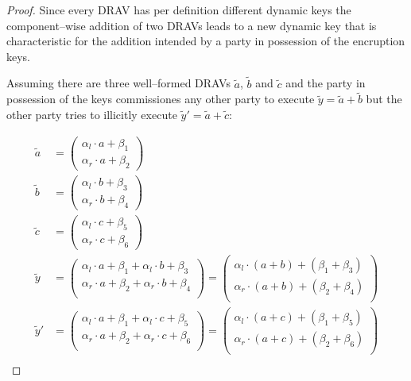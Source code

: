 \begin{proof}

  Since every DRAV has per definition different dynamic keys the
  component--wise addition of two DRAVs leads to a new dynamic key that is
  characteristic for the addition intended by a party in possession of the
  encruption keys.

  Assuming there are three well--formed DRAVs $\widetilde{a}$, $\widetilde{b}$
  and $\widetilde{c}$ and the party in possession of the keys commissiones any
  other party to execute $\widetilde{y} = \widetilde{a} + \widetilde{b}$ but the
  other party tries to illicitly execute $\widetilde{y}' = \widetilde{a} +
  \widetilde{c}$:

  \begin{align*}
    \widetilde{a} &=
    \begin{pmatrix}
      \alpha_l \cdot a + \beta_1\\
      \alpha_r \cdot a + \beta_2
    \end{pmatrix}\\
    \widetilde{b} &=
    \begin{pmatrix}
      \alpha_l \cdot b + \beta_3\\
      \alpha_r \cdot b + \beta_4
    \end{pmatrix}\\
    \widetilde{c} &=
    \begin{pmatrix}
      \alpha_l \cdot c + \beta_5\\
      \alpha_r \cdot c + \beta_6
    \end{pmatrix}\\
    \widetilde{y} &=
    \begin{pmatrix}
      \alpha_l \cdot a + \beta_1 + \alpha_l \cdot b + \beta_3\\
      \alpha_r \cdot a + \beta_2 + \alpha_r \cdot b + \beta_4\\
    \end{pmatrix} =
    \begin{pmatrix}
      \alpha_l \cdot (a+b) + (\beta_1 + \beta_3)\\
      \alpha_r \cdot (a+b) + (\beta_2 + \beta_4)\\
    \end{pmatrix}\\
    \widetilde{y}' &=
    \begin{pmatrix}
      \alpha_l \cdot a + \beta_1 + \alpha_l \cdot c + \beta_5\\
      \alpha_r \cdot a + \beta_2 + \alpha_r \cdot c + \beta_6\\
    \end{pmatrix} =
    \begin{pmatrix}
      \alpha_l \cdot (a+c) + (\beta_1 + \beta_5)\\
      \alpha_r \cdot (a+c) + (\beta_2 + \beta_6)\\
    \end{pmatrix}\\
  \end{align*}


\end{proof}
